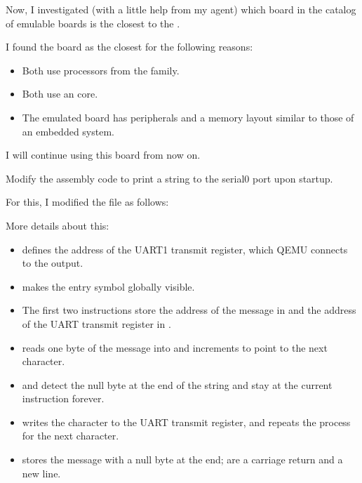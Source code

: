Now, I investigated (with a little help from my agent) which board in the catalog of emulable boards is the closest to the .

I found the board  as the closest for the following reasons:

\begin{itemize}
    \item Both use processors from the  family.
    \item Both use an  core.
    \item The emulated board has peripherals and a memory layout similar to those of an embedded  system.
\end{itemize}

I will continue using this  board from now on.

\begin{callout}
Modify the assembly code to print a string to the serial0 port upon startup.
\end{callout}

For this, I modified the file as follows:


More details about this:

\begin{itemize}
    \item {} defines the address of the UART1 transmit register, which QEMU connects to the  output.
    \item {} makes the entry symbol globally visible.
    \item The first two  instructions store the address of the message in  and the address of the UART transmit register in .
    \item {} reads one byte of the message into  and increments  to point to the next character.
    \item {} and  detect the null byte at the end of the string and stay at the current instruction forever.
    \item {} writes the character to the UART transmit register, and  repeats the process for the next character.
    \item {} stores the message with a null byte at the end;  are a carriage return and a new line.
\end{itemize}

